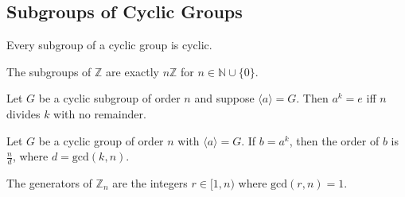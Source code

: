 \documentclass[12pt, letterpaper]{report}
\begin{document}
\subsection*{Subgroups of Cyclic Groups}
\begin{theorem}
	Every subgroup of a cyclic group is cyclic.
\end{theorem}
\begin{corollary}
	The subgroups of \(\mathbb{Z} \) are exactly \(n\mathbb{Z} \) for \(n\in\mathbb{N} \cup \{ 0 \} \). 
\end{corollary}
\begin{proposition}
	Let \(G\) be a cyclic subgroup of order \(n\) and suppose \(\langle a \rangle=G \). Then \(a^k =e\) iff \(n\) divides \(k\) with no remainder.
\end{proposition}
\begin{theorem}
	Let \(G\) be a cyclic group of order \(n\) with \(\langle a \rangle =G\). If \(b=a^k\), then the order of \(b\) is \(\frac{n}{d}\), where \(d=\text{gcd}(k,n) \).
\end{theorem}
\begin{corollary}
	The generators of \(\mathbb{Z} _n\) are the integers \(r\in[1,n)\) where \(\text{gcd}(r,n)=1 \).
\end{corollary}
\end{document}
